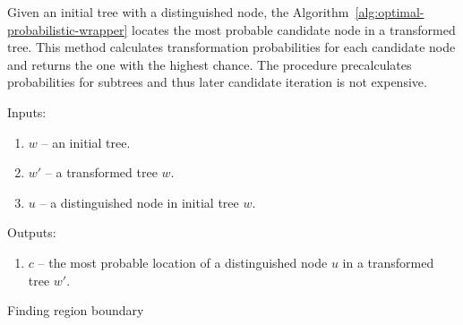 Given an initial tree with a distinguished node, the Algorithm~\ref{alg:optimal-probabilistic-wrapper} locates the most probable candidate node in a transformed tree. This method calculates transformation probabilities for each candidate node and returns the one with the highest chance. The procedure precalculates probabilities for subtrees and thus later candidate iteration is not expensive.

Inputs: 

\begin{enumerate}
	\item $w$ -- an initial tree.
	\item $w'$ -- a transformed tree $w$.
	\item $u$ -- a distinguished node in initial tree $w$.
\end{enumerate}

Outputs: 

\begin{enumerate}
	\item $c$ -- the most probable location of a distinguished node $u$ in a transformed tree $w'$.
\end{enumerate}


\IncMargin{2em}
\begin{algorithm}

	\DontPrintSemicolon

	\BlankLine


	\caption{Finding region boundary}

\end{algorithm}
\DecMargin{2em}






